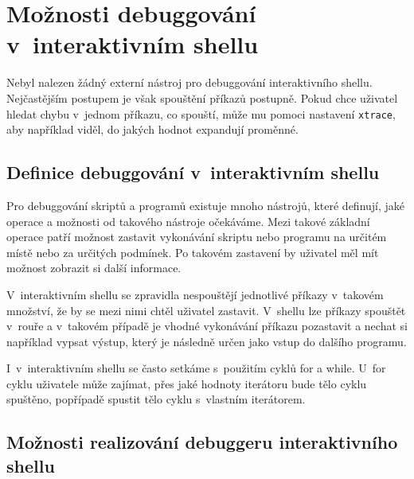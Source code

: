 \documentclass[thesis=M,czech]{FITthesis}[2012/06/26]
\begin{document}




%
%
%
%
%
\section{Možnosti debuggování v~interaktivním shellu}

Nebyl nalezen žádný externí nástroj pro debuggování interaktivního shellu. Nejčastějším postupem je však spouštění příkazů postupně. Pokud chce uživatel hledat chybu v~jednom příkazu, co spouští, může mu pomoci nastavení \texttt{xtrace}, aby například viděl, do jakých hodnot expandují proměnné.



%
%
\subsection{Definice debuggování v~interaktivním shellu}


Pro debuggování skriptů a programů existuje mnoho nástrojů, které definují, jaké operace a možnosti od takového nástroje očekáváme. Mezi takové základní operace patří možnost zastavit vykonávání skriptu nebo programu na určitém místě nebo za určitých podmínek. Po takovém zastavení by uživatel měl mít možnost zobrazit si další informace.

V~interaktivním shellu se zpravidla nespouštějí jednotlivé příkazy v~takovém množství, že by se mezi nimi chtěl uživatel zastavit. V~shellu lze příkazy spouštět v~rouře a v~takovém případě je vhodné vykonávání příkazu pozastavit a nechat si například vypsat výstup, který je následně určen jako vstup do dalšího programu.

I~v~interaktivním shellu se často setkáme s~použitím cyklů for a while. U~for cyklu uživatele může zajímat, přes jaké hodnoty iterátoru bude tělo cyklu spuštěno, popřípadě spustit tělo cyklu s~vlastním iterátorem.




\subsection{Možnosti realizování debuggeru interaktivního shellu}
\end{document}
